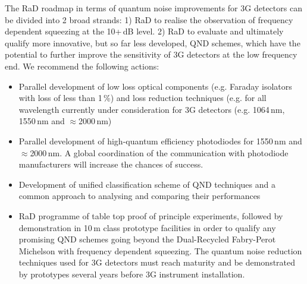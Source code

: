 The  \ac{RaD}   roadmap in terms of quantum noise improvements for  \ac{3G}   detectors can be divided into 2 broad strands: 1)  \ac{RaD}   to realise the observation of frequency dependent squeezing at the 10+\,dB level. 2)  \ac{RaD}   to evaluate and ultimately qualify more innovative, but so far less developed, \ac{QND} schemes, which have the potential to further improve the sensitivity of  \ac{3G}   detectors at the low frequency end.  
We recommend the following actions:
\begin{itemize}
    \item Parallel development of low loss optical components (e.g. Faraday isolators with loss of less than 1\,\%) and loss reduction techniques (e.g. for all wavelength currently under consideration for  \ac{3G}   detectors (e.g. 1064\,nm, 1550\,nm and $\approx$2000\,nm) 
    \item Parallel development of high-quantum efficiency photodiodes for 1550\,nm and $\approx$2000\,nm. A global coordination of the communication with photodiode manufacturers will increase the chances of success. 
    \item Development of unified classification scheme of  \ac{QND}   techniques and a common approach to analysing and comparing their performances
    \item  \ac{RaD}   programme of table top proof of principle experiments, followed by demonstration in 10\,m class prototype facilities in order to qualify any promising  \ac{QND}   schemes going beyond the Dual-Recycled Fabry-Perot Michelson with frequency dependent squeezing.  The quantum noise reduction techniques used for  \ac{3G}   detectors must reach maturity and be demonstrated by prototypes several years before  \ac{3G}   instrument installation.
\end{itemize}
 
 

